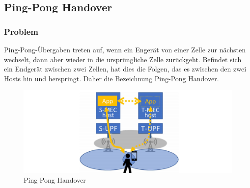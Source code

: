 \documentclass[runningheads]{llncs}
\numberwithin{figure}{section}
\begin{document}
\subsection{Ping-Pong Handover}
\subsubsection{Problem}
Ping-Pong-Übergaben treten auf, wenn ein Engerät von einer Zelle zur nächsten wechselt, dann aber wieder in die ursprüngliche 
Zelle zurückgeht. Befindet sich ein Endgerät zwischen zwei Zellen, hat dies die Folgen, das es zwischen den zwei Hosts
hin und herspringt. Daher die Bezeichnung Ping-Pong Handover.
\begin{figure}
  \includegraphics[width=\linewidth]{images/pingpong.png}
  \caption{Ping Pong Handover}
  \label{fig:pingpong}
\end{figure}
\end{document}
